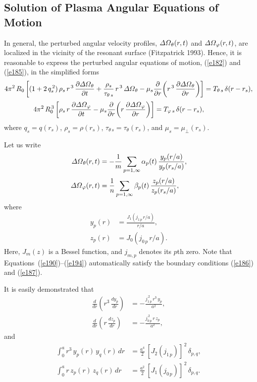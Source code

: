 \documentclass[notitlepage,12pt]{article}
\begin{document}
\subsection{Solution of Plasma Angular Equations of Motion}
In general, the perturbed angular velocity profiles, ${\mit\Delta\Omega}_\theta(r,t)$ and ${\mit\Delta\Omega}_\varphi(r,t)$, are
localized in the vicinity of the resonant surface (Fitzpatrick 1993). Hence, it is reasonable to express  the perturbed angular
equations of motion, (\ref{e182}) and (\ref{e185}), in the simplified  forms
\begin{align}\label{e188}
4\pi^2\,R_0\left[(1+2\,q_s^{\,2})\,\rho_s\,r^{\,3}\,\frac{\partial {\mit\Delta\Omega}_\theta}{\partial t}+ \frac{\rho_s}{\tau_{\theta\,s}}\,r^{\,3}\,{\mit\Delta\Omega}_\theta-\mu_s\frac{\partial}{\partial r}\!\left(r^{\,3}\,\frac{\partial{\mit\Delta\Omega}_\theta}{\partial r}\right)\right]
&=T_{\theta\,s}\,\delta(r-r_s),\\[0.5ex]
4\pi^2\,R_0^{\,3}\left[\rho_s\,r\,\frac{\partial {\mit\Delta\Omega}_\varphi}{\partial t}-\mu_s\frac{\partial}{\partial r}\!\left(r\,\frac{\partial{\mit\Delta\Omega}_\varphi}{\partial r}\right)\right]
=T_{\varphi\,s}\,\delta(r-r_s),\label{e189}
\end{align}
where $q_s=q(r_s)$, $\rho_s=\rho(r_s)$, $\tau_{\theta\,s}=\tau_\theta(r_s)$, and $\mu_s=\mu_\perp(r_s)$. 

Let us write
\begin{align}\label{e190}
{\mit\Delta\Omega}_\theta(r,t) &= - \frac{1}{m}\sum_{p=1,\infty} \alpha_p(t)\,\frac{y_p(r/a)}{y_p(r_s/a)},\\[0.5ex]
{\mit\Delta\Omega}_\varphi(r,t) &=  \frac{1}{n}\sum_{p=1,\infty} \beta_p(t)\,\frac{z_p(r/a)}{z_p(r_s/a)},\label{e191}
\end{align}
where
\begin{align}
y_p(r) &= \frac{J_1(j_{1\,p}\,r/a)}{r/a},\\[0.5ex]
z_p(r) &= J_0(j_{0\,p}\,r/a).\label{e194}
\end{align}
Here, $J_m(z)$ is a Bessel function, and $j_{m,p}$ denotes its $p$th zero. Note that
Equations~(\ref{e190})--(\ref{e194}) automatically satisfy the boundary conditions (\ref{e186}) and (\ref{e187}). 

It is easily demonstrated that 
\begin{align}
\frac{d}{dr}\!\left(r^{3}\,\frac{dy_p}{dr}\right)&= -\frac{j_{1\,p}^{\,2}\,r^{3}\,y_p}{a^{2}},\\[0.5ex]
\frac{d}{dr}\!\left(r\,\frac{dz_p}{dr}\right)&= -\frac{j_{0\,p}^{\,2}\,r\,z_p}{a^{2}},
\end{align}
and
\begin{align}
\int_0^a r^{3}\,y_p(r)\,y_q(r)\,dr &= \frac{a^{4}}{2}\,[J_2(j_{1\,p})]^{\,2}\,\delta_{p,q},\\[0.5ex]
\int_0^a r\,z_p(r)\,z_q(r)\,dr &= \frac{a^{2}}{2}\,[J_1(j_{0\,p})]^{\,2}\,\delta_{p,q}.\label{e197}
\end{align}
\end{document}
